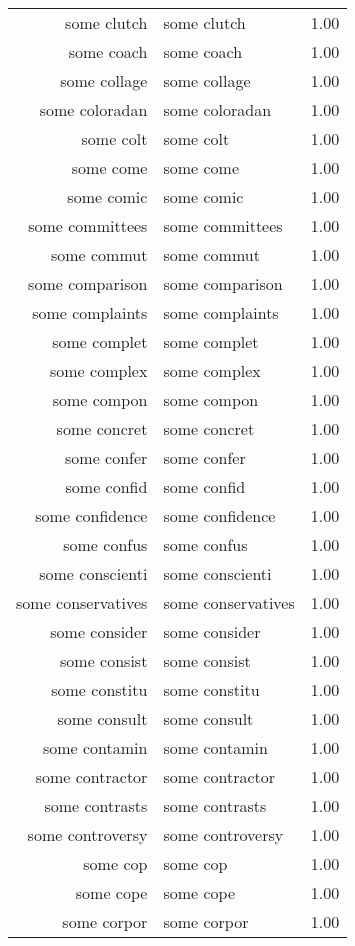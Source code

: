 \begin{table}[ht]
\begin{tabular}{rlr}
  some clutch & some clutch & 1.00 \\ 
  some coach & some coach & 1.00 \\ 
  some collage & some collage & 1.00 \\ 
  some coloradan & some coloradan & 1.00 \\ 
  some colt & some colt & 1.00 \\ 
  some come & some come & 1.00 \\ 
  some comic & some comic & 1.00 \\ 
  some committees & some committees & 1.00 \\ 
  some commut & some commut & 1.00 \\ 
  some comparison & some comparison & 1.00 \\ 
  some complaints & some complaints & 1.00 \\ 
  some complet & some complet & 1.00 \\ 
  some complex & some complex & 1.00 \\ 
  some compon & some compon & 1.00 \\ 
  some concret & some concret & 1.00 \\ 
  some confer & some confer & 1.00 \\ 
  some confid & some confid & 1.00 \\ 
  some confidence & some confidence & 1.00 \\ 
  some confus & some confus & 1.00 \\ 
  some conscienti & some conscienti & 1.00 \\ 
  some conservatives & some conservatives & 1.00 \\ 
  some consider & some consider & 1.00 \\ 
  some consist & some consist & 1.00 \\ 
  some constitu & some constitu & 1.00 \\ 
  some consult & some consult & 1.00 \\ 
  some contamin & some contamin & 1.00 \\ 
  some contractor & some contractor & 1.00 \\ 
  some contrasts & some contrasts & 1.00 \\ 
  some controversy & some controversy & 1.00 \\ 
  some cop & some cop & 1.00 \\ 
  some cope & some cope & 1.00 \\ 
  some corpor & some corpor & 1.00 \\ 

\end{tabular}
\end{table}
